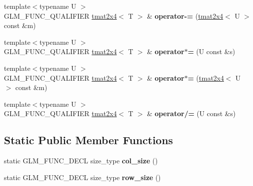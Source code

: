 \begin{DoxyCompactItemize}
\item 
\hypertarget{structglm_1_1detail_1_1tmat2x4_aab47a3bca1d894ee96bae1c783ce03bf}{}{\footnotesize template$<$typename U $>$ }\\G\+L\+M\+\_\+\+F\+U\+N\+C\+\_\+\+Q\+U\+A\+L\+I\+F\+I\+E\+R \hyperlink{structglm_1_1detail_1_1tmat2x4}{tmat2x4}$<$ T $>$ \& {\bfseries operator-\/=} (\hyperlink{structglm_1_1detail_1_1tmat2x4}{tmat2x4}$<$ U $>$ const \&m)\label{structglm_1_1detail_1_1tmat2x4_aab47a3bca1d894ee96bae1c783ce03bf}

\item 
\hypertarget{structglm_1_1detail_1_1tmat2x4_a5c7b042dbf2b36f6b36eaa070b9a7fbf}{}{\footnotesize template$<$typename U $>$ }\\G\+L\+M\+\_\+\+F\+U\+N\+C\+\_\+\+Q\+U\+A\+L\+I\+F\+I\+E\+R \hyperlink{structglm_1_1detail_1_1tmat2x4}{tmat2x4}$<$ T $>$ \& {\bfseries operator$\ast$=} (U const \&s)\label{structglm_1_1detail_1_1tmat2x4_a5c7b042dbf2b36f6b36eaa070b9a7fbf}

\item 
\hypertarget{structglm_1_1detail_1_1tmat2x4_ac2810d6186ceb53924f74eecfac80a4e}{}{\footnotesize template$<$typename U $>$ }\\G\+L\+M\+\_\+\+F\+U\+N\+C\+\_\+\+Q\+U\+A\+L\+I\+F\+I\+E\+R \hyperlink{structglm_1_1detail_1_1tmat2x4}{tmat2x4}$<$ T $>$ \& {\bfseries operator$\ast$=} (\hyperlink{structglm_1_1detail_1_1tmat2x4}{tmat2x4}$<$ U $>$ const \&m)\label{structglm_1_1detail_1_1tmat2x4_ac2810d6186ceb53924f74eecfac80a4e}

\item 
\hypertarget{structglm_1_1detail_1_1tmat2x4_ad198d56e4a45d6294d8c3edaf9c9e49b}{}{\footnotesize template$<$typename U $>$ }\\G\+L\+M\+\_\+\+F\+U\+N\+C\+\_\+\+Q\+U\+A\+L\+I\+F\+I\+E\+R \hyperlink{structglm_1_1detail_1_1tmat2x4}{tmat2x4}$<$ T $>$ \& {\bfseries operator/=} (U const \&s)\label{structglm_1_1detail_1_1tmat2x4_ad198d56e4a45d6294d8c3edaf9c9e49b}

\end{DoxyCompactItemize}
\subsection*{Static Public Member Functions}
\begin{DoxyCompactItemize}
\item 
\hypertarget{structglm_1_1detail_1_1tmat2x4_a5ed23bf77b036f85b30c034fb168d967}{}static G\+L\+M\+\_\+\+F\+U\+N\+C\+\_\+\+D\+E\+C\+L size\+\_\+type {\bfseries col\+\_\+size} ()\label{structglm_1_1detail_1_1tmat2x4_a5ed23bf77b036f85b30c034fb168d967}

\item 
\hypertarget{structglm_1_1detail_1_1tmat2x4_a58e10cf43d601b15d3e76b310d3c6d86}{}static G\+L\+M\+\_\+\+F\+U\+N\+C\+\_\+\+D\+E\+C\+L size\+\_\+type {\bfseries row\+\_\+size} ()\label{structglm_1_1detail_1_1tmat2x4_a58e10cf43d601b15d3e76b310d3c6d86}

\end{DoxyCompactItemize}
